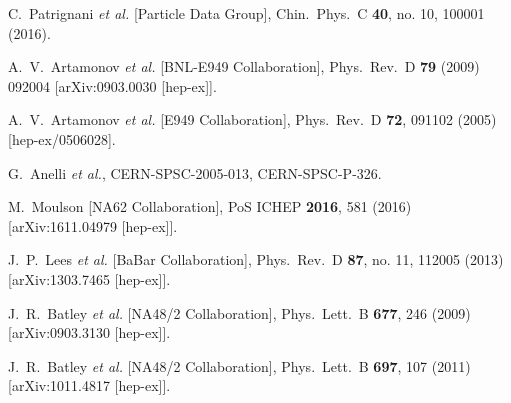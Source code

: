\documentclass[preprint,prd,aps,tighten,nofootinbib,amssymb]{revtex4}
\begin{document}
\begin{thebibliography}{99}
  C.~Patrignani {\it et al.} [Particle Data Group],
  Chin.\ Phys.\ C {\bf 40}, no. 10, 100001 (2016).
  
  A.~V.~Artamonov {\it et al.} [BNL-E949 Collaboration],
  Phys.\ Rev.\ D {\bf 79} (2009) 092004
  [arXiv:0903.0030 [hep-ex]].
  
  A.~V.~Artamonov {\it et al.} [E949 Collaboration],
  Phys.\ Rev.\ D {\bf 72}, 091102 (2005)
  [hep-ex/0506028].
  
  G.~Anelli {\it et al.},
  CERN-SPSC-2005-013, CERN-SPSC-P-326.
  
  M.~Moulson [NA62 Collaboration],
  PoS ICHEP {\bf 2016}, 581 (2016)
  [arXiv:1611.04979 [hep-ex]].
  
  J.~P.~Lees {\it et al.} [BaBar Collaboration],
  Phys.\ Rev.\ D {\bf 87}, no. 11, 112005 (2013)
  [arXiv:1303.7465 [hep-ex]].
  
  J.~R.~Batley {\it et al.} [NA48/2 Collaboration],
  Phys.\ Lett.\ B {\bf 677}, 246 (2009)
  [arXiv:0903.3130 [hep-ex]].
  
  J.~R.~Batley {\it et al.} [NA48/2 Collaboration],
  Phys.\ Lett.\ B {\bf 697}, 107 (2011)
  [arXiv:1011.4817 [hep-ex]].
  

\end{thebibliography}
\end{document}

